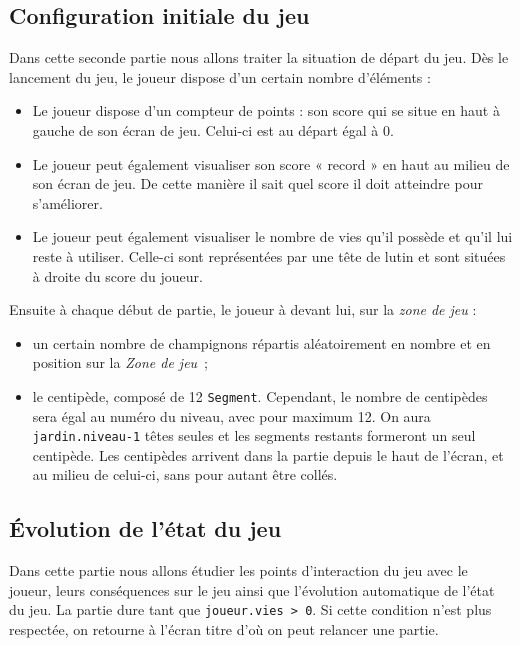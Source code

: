 \subsection{Configuration initiale du jeu}
Dans cette seconde partie nous allons traiter la situation de départ du jeu. Dès le lancement du jeu, le joueur dispose d'un certain nombre d'éléments : 

\begin{itemize}
	\item Le joueur dispose d'un compteur de points : son score qui se situe en haut à gauche de son écran de jeu. Celui-ci est au départ égal à 0.
	\item Le joueur peut également visualiser son score « record » en haut au milieu de son écran de jeu. De cette manière il sait quel score il doit atteindre pour s'améliorer.
	\item Le joueur peut également visualiser le nombre de vies qu'il possède et qu'il lui reste à utiliser. Celle-ci sont représentées par une tête de lutin et sont situées à droite du score du joueur.
\end{itemize}

Ensuite à chaque début de partie, le joueur à devant lui, sur la \emph{zone de jeu} : 

\begin{itemize}
	\item un certain nombre de champignons répartis aléatoirement en nombre et en position sur la  \emph{Zone de jeu}~;
	\item le centipède, composé de 12 \texttt{Segment}. Cependant, le nombre de centipèdes sera égal au numéro du niveau, avec pour maximum 12. On aura \texttt{jardin.niveau-1} têtes seules et les segments restants formeront un seul centipède. Les centipèdes arrivent dans la partie depuis le haut de l'écran, et au milieu de celui-ci, sans pour autant être collés.
\end{itemize}
 

\subsection{Évolution de l'état du jeu}

Dans cette partie nous allons étudier les points d'interaction du jeu avec le joueur, leurs conséquences sur le jeu ainsi que l'évolution automatique de l'état du jeu. La partie dure tant que \texttt{joueur.vies > 0}. Si cette condition n'est plus respectée, on retourne à l'écran titre d'où on peut relancer une partie.

